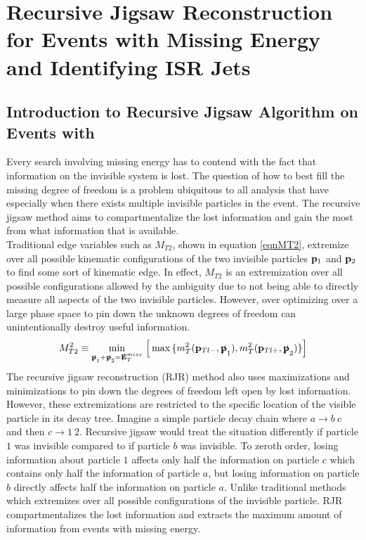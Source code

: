\chapter{Recursive Jigsaw Reconstruction for Events with Missing Energy and Identifying ISR Jets}
\label{chap:jigsaw}

\section{Introduction to Recursive Jigsaw Algorithm on Events with \MET}
\label{Jigsaw:Intro}

\indent Every search involving missing energy has to contend with the fact that information on the invisible system is lost.  The question of how to best fill the missing degree of freedom is a problem ubiquitous to all analysis that have \MET especially when there exists multiple invisible particles in the event. The recursive jigsaw method aims to compartmentalize the lost information and gain the most from what information that is available.\\
\indent Traditional edge variables such as $M_{T2}$, shown in equation \ref{eqnMT2}, extremize over all possible kinematic configurations of the two invisible particles ${\bf p}_1$ and ${\bf p}_2$ to find some sort of kinematic edge.  In effect, $M_{T2}$ is an extremization over all possible configurations allowed by the ambiguity due to not being able to directly measure all aspects of the two invisible particles.  However, over optimizing over a large phase space to pin down the unknown degrees of freedom can unintentionally destroy useful information.  \\
\begin{equation}
\label{eqnMT2}
M^{2}_{T2} \equiv \mymin[\slashed{\bf p}_{1}+\slashed{\bf p}_{2}=\slashed{\bf E}_{T}^{miss}]  \Big[ \mymax[] \{ m_{T}^{2}({\bf p}_{Tl-},\slashed{\bf p}_{1}), m_{T}^{2}({\bf p}_{Tl+},\slashed{\bf p}_{2})\} \Big]
\end{equation}
\indent The recursive jigsaw reconstruction (RJR) method also uses maximizations and minimizations to pin down the degrees of freedom left open by lost information.  However, these extremizations are restricted to the specific location of the visible particle in its decay tree.  Imagine a simple particle decay chain where $a \rightarrow b~c$ and then $c \rightarrow 1~2$.  Recursive jigsaw would treat the situation differently if particle $1$ was invisible compared to if particle $b$ was invisible.  To zeroth order, losing information about particle $1$ affects only half the information on particle $c$ which contains only half the information of particle $a$, but losing information on particle $b$ directly affects half the information on particle $a$.   Unlike traditional methods which extremizes over all possible configurations of the invisible particle. RJR compartmentalizes the lost information and extracts the maximum amount of information from events with missing energy.  \\
